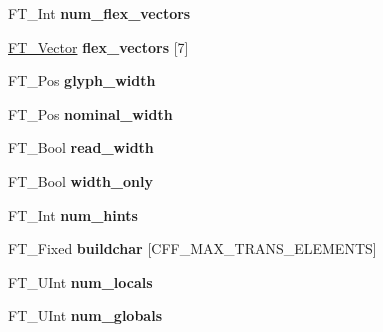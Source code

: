 \begin{DoxyCompactItemize}
\item 
\mbox{\label{struct_c_f_f___decoder___aef7e8a5c32357885d3e6c2777e1dd309}} 
F\+T\+\_\+\+Int {\bfseries num\+\_\+flex\+\_\+vectors}
\item 
\mbox{\label{struct_c_f_f___decoder___a075bfb59c5b5b5c16810727315657e3f}} 
\hyperlink{struct_f_t___vector__}{F\+T\+\_\+\+Vector} {\bfseries flex\+\_\+vectors} \mbox{[}7\mbox{]}
\item 
\mbox{\label{struct_c_f_f___decoder___a0d3d6ccc7097a1e256543f511d47c7e9}} 
F\+T\+\_\+\+Pos {\bfseries glyph\+\_\+width}
\item 
\mbox{\label{struct_c_f_f___decoder___a4e29c00c24380a115f6b4027f8ad257f}} 
F\+T\+\_\+\+Pos {\bfseries nominal\+\_\+width}
\item 
\mbox{\label{struct_c_f_f___decoder___a19c69b106557653d4a02ab16152fdb79}} 
F\+T\+\_\+\+Bool {\bfseries read\+\_\+width}
\item 
\mbox{\label{struct_c_f_f___decoder___a0e2c2a7bb6a7c56e6e883058e7f03119}} 
F\+T\+\_\+\+Bool {\bfseries width\+\_\+only}
\item 
\mbox{\label{struct_c_f_f___decoder___a386558299ea4efd85294b93ad515ff2b}} 
F\+T\+\_\+\+Int {\bfseries num\+\_\+hints}
\item 
\mbox{\label{struct_c_f_f___decoder___a57f3870e46c81c7c2f10394084b451b1}} 
F\+T\+\_\+\+Fixed {\bfseries buildchar} \mbox{[}C\+F\+F\+\_\+\+M\+A\+X\+\_\+\+T\+R\+A\+N\+S\+\_\+\+E\+L\+E\+M\+E\+N\+TS\mbox{]}
\item 
\mbox{\label{struct_c_f_f___decoder___ac6c2553ef54a77da4100a28d71b3aa34}} 
F\+T\+\_\+\+U\+Int {\bfseries num\+\_\+locals}
\item 
\mbox{\label{struct_c_f_f___decoder___a497ad7a1cf8ff1b1c40b4bffd3d2bb94}} 
F\+T\+\_\+\+U\+Int {\bfseries num\+\_\+globals}
\item 
\mbox{\label{struct_c_f_f___decoder___a3cdcfb160c93736ad91e17682296749e}} 

\end{DoxyCompactItemize}
